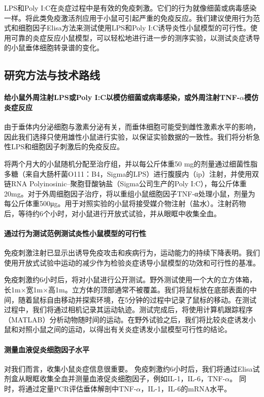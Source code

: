   LPS和Poly I:C在炎症过程中是有效的免疫刺激。它们的行为就像细菌或病毒感染一样。将此类免疫激活剂应用于小鼠可引起严重的免疫反应。我们建议使用行为范式和细胞因子Elisa方法来测试使用LPS和Poly I:C诱导炎性小鼠模型的可行性。使用可靠的炎症反应小鼠模型，可以轻松地进行进一步的测序实验，以测试炎症诱导的小鼠垂体细胞转录谱的变化。
\subsection{研究方法与技术路线}
\paragraph{给小鼠外周注射LPS或Poly I:C以模仿细菌或病毒感染，或外周注射TNF-$\alpha$模仿炎症反应}
  由于垂体内分泌细胞与激素分泌有关，而垂体细胞可能受到雌性激素水平的影响，因此我们选择只使用雄性小鼠进行实验，以保证实验数据的一致性。我们将分析急性LPS和细胞因子刺激后的免疫反应。

  将两个月大的小鼠随机分配至治疗组，并以每公斤体重50 mg的剂量通过细菌性脂多糖（来自大肠杆菌O111：B4，Sigma的LPS）进行腹膜内（ip）注射，并使用双链RNA Polyinosinic–聚胞苷酸钠盐（Sigma公司生产的Poly I:C），每公斤体重20mg。对于外周细胞因子治疗，将以重组小鼠细胞因子TNF-α处理小鼠，剂量为每公斤体重500μg。用于对照实验的小鼠将接受媒介物注射（盐水）。注射药物后，等待约6个小时，对小鼠进行开放式试验，并从眼眶中收集全血。
\paragraph{通过行为测试范例测试炎性小鼠模型的可行性}
  免疫刺激注射已显示出诱导免疫攻击和疾病行为，运动能力的持续下降表明。我们使用开放式试验中运动的减少作为检验炎症诱导小鼠模型的功效和可行性的基准。

  免疫刺激约6小时后，将对小鼠进行公开测试。野外测试使用一个大的立方体箱，长1m×宽1m×高1m。立方体的顶部通常不被覆盖。我们将鼠标放在底部表面的中间，随着鼠标自由移动并探索环境，在5分钟的过程中记录了鼠标的移动。在测试过程中，我们将通过相机记录其运动轨迹。测试完成后，将使用计算机跟踪程序（MATLAB）分析动物随时间的运动。在野外试验之后，我们将比较炎症诱发小鼠和对照小鼠之间的运动，以得出有关炎症诱发小鼠模型可行性的结论。
\paragraph{测量血液促炎细胞因子水平}
  对我们而言，收集小鼠炎症信息很重要。 免疫刺激约6小时后，我们将通过Elisa试剂盒从眼眶收集全血并测量血液促炎细胞因子，例如IL-1，IL-6，TNF-$\alpha$。 同时，将通过定量PCR评估垂体解剖中TNF-$\alpha$，IL-1，IL-6的mRNA水平。

